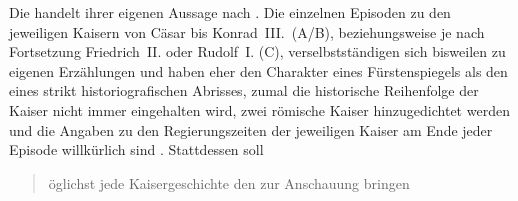 
Die \KC{} handelt ihrer eigenen Aussage nach
\autocite[19--20]{schroeder1895}. Die einzelnen Episoden zu den jeweiligen
Kaisern von Cäsar bis Konrad~III.\ (A/B), beziehungsweise je nach Fortsetzung
Friedrich~II. oder Rudolf~I. (C), verselbstständigen sich bisweilen zu eigenen
Erzählungen und haben eher den Charakter eines Fürstenspiegels als den eines
strikt historiografischen Abrisses, zumal die historische Reihenfolge der
Kaiser nicht immer eingehalten wird, zwei römische Kaiser hinzugedichtet werden
und die Angaben zu den Regierungszeiten der jeweiligen Kaiser am Ende jeder
Episode willkürlich sind \autocite[954--960]{nellmann1983}. Stattdessen soll
\blockcquote[957]{nellmann1983}{öglichst jede Kaisergeschichte
\textelp{} den  \textelp{}
zur Anschauung bringen}.

